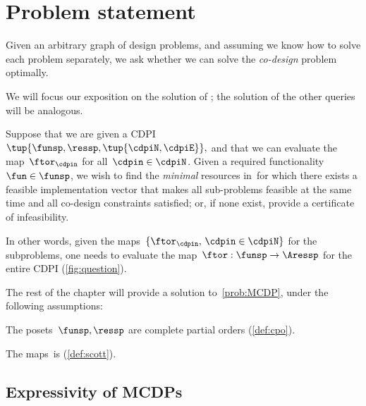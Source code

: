 

\section{Problem statement}
\label{sec:Optimization}

Given an arbitrary graph of design problems, and assuming we know
how to solve each problem separately, we ask whether we can solve
the \emph{co-design} problem optimally.

We will focus our exposition on the solution of \FixFunMinReq; the solution of the other queries will be analogous.






\begin{problem}
  \label{prob:MCDP}Suppose that we are given a CDPI~$\tup{ \funsp,\ressp,\tup{ \cdpiN,\cdpiE} } ,$
  and that we can evaluate the map~$\ftor_{\cdpin}$ for all~$\cdpin\in\cdpiN$.
  Given a required functionality~$\fun\in\funsp$, we wish to find
  the \emph{minimal} resources in~\ressp for which there exists
  a feasible implementation vector that makes all sub-problems feasible
  at the same time and all co-design constraints satisfied; or, if
  none exist, provide a certificate of infeasibility.
\end{problem}
In other words, given the maps~$\{\ftor_{\cdpin},\,\cdpin\in\cdpiN\}$
for the subproblems, one needs to evaluate the map~$\ftor:\funsp\rightarrow\Aressp$
for the entire CDPI (\cref{fig:question}).


The rest of the chapter will provide a solution to~\cref{prob:MCDP},
under the following assumptions:

\begin{compactenum}
  \item The posets~$\funsp,\ressp$ are complete partial orders (\cref{def:cpo}).
  \item The maps~\ftor is \scottcontinuous (\cref{def:scott}).
\end{compactenum}

\subsection{Expressivity of MCDPs}

